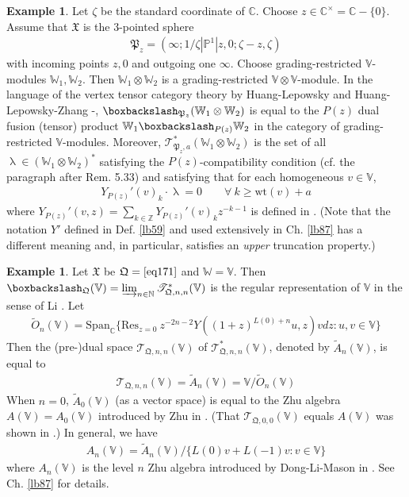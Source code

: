 \documentclass[11pt,b5paper,notitlepage]{article}
\theoremstyle{definition}
\newtheorem{eg}[df]{Example}
\theoremstyle{plain}
\newcommand{\fk}{\mathfrak}
\newcommand{\wtd}{\widetilde}
\newcommand{\Res}{\mathrm{Res}}
\newcommand{\Span}{\mathrm{Span}}
\newcommand{\scr}{\mathscr}
\newcommand{\Vbb}{\mathbb V}
\newcommand{\Wbb}{\mathbb W}
\newcommand{\Cbb}{\mathbb C}
\newcommand{\Nbb}{\mathbb N}
\newcommand{\Zbb}{\mathbb Z}
\newcommand{\Pbb}{\mathbb P}
\newcommand{\wt}{\mathrm{wt}}
\newcommand{\<}{\left\langle}
\renewcommand{\>}{\right\rangle}
\newcommand{\bbs}{\boxbackslash}
\newcommand{\fq}{{\mathfrak Q}}
\numberwithin{equation}{subsection}
\begin{document}
\begin{eg}
Let $\zeta$ be the standard coordinate of $\Cbb$. Choose $z\in\Cbb^\times=\Cbb-\{0\}$. Assume that $\fk X$ is the $3$-pointed sphere
\begin{align}
\fk P_z=(\infty;1/\zeta| \Pbb^1|z,0;\zeta-z,\zeta)
\end{align}
with incoming points $z,0$ and outgoing one $\infty$. Choose grading-restricted $\Vbb$-modules $\Wbb_1,\Wbb_2$. Then $\Wbb_1\otimes\Wbb_2$ is a grading-restricted $\Vbb\otimes\Vbb$-module. In the language of the vertex tensor category theory by Huang-Lepowsky \cite{HL-tensor-1,HL-tensor-2,HL-tensor-3,Hua-tensor-4} and Huang-Lepowsky-Zhang \cite{HLZ1,HLZ2}-\cite{HLZ8}, $\bbs_{\fk P_z}(\Wbb_1\otimes \Wbb_2)$ is equal to the $P(z)$ dual fusion (tensor) product $\Wbb_1\bbs_{P(z)}\Wbb_2$ in the category of grading-restricted $\Vbb$-modules. Moreover, $\scr T_{\fk P_z,a}^*(\Wbb_1\otimes\Wbb_2)$ is the set of all $\uplambda\in(\Wbb_1\otimes\Wbb_2)^*$ satisfying the $P(z)$-compatibility condition (cf. \cite[Sec. 5.2]{HLZ4} the paragraph after Rem. 5.33) and satisfying that for each homogeneous $v\in \Vbb$,
\begin{align}
Y_{P(z)}'(v)_k\cdot\uplambda=0\qquad\forall~k\geq\wt(v)+a
\end{align}
where $Y_{P(z)}'(v,z)=\sum_{k\in\Zbb}Y_{P(z)}'(v)_kz^{-k-1}$ is defined in \cite[Def. 5.3]{HLZ4}. (Note that the notation $Y'$ defined in Def. \ref{lb59} and used extensively in Ch. \ref{lb87} has a different meaning and, in particular, satisfies an \emph{upper} truncation property.)
\end{eg}



\begin{eg}
Let $\fk X$ be $\fq=\eqref{eq171}$ and $\Wbb=\Vbb$. Then $\bbs_\fq(\Vbb)=\varinjlim_{n\in\Nbb}\scr T_{\fq,n,n}^*(\Vbb)$ is the regular representation of $\Vbb$ in the sense of Li \cite{Li-regular-rep,LS-twisted-regular-rep}. Let 
\begin{gather}
\wtd O_n(\Vbb)=\Span_\Cbb\big\{\Res_{z=0}~z^{-2n-2}Y((1+z)^{L(0)+n}u,z)vdz:u,v\in\Vbb  \big\}
\end{gather}
Then the (pre-)dual space $\scr T_{\fq,n,n}(\Vbb)$ of $\scr T_{\fq,n,n}^*(\Vbb)$, denoted by $\wtd A_n(\Vbb)$, is equal to
\begin{gather}
\scr T_{\fq,n,n}(\Vbb)=\wtd A_n(\Vbb)=\Vbb/\wtd O_n(\Vbb)
\end{gather}
When $n=0$, $\wtd A_0(\Vbb)$ (as a vector space) is equal to the Zhu algebra $A(\Vbb)=A_0(\Vbb)$ introduced by Zhu in \cite{Zhu-modular-invariance}. (That $\scr T_{\fq,0,0}(\Vbb)$ equals $A(\Vbb)$ was shown in \cite[Prop. 7.2.2 and A.2.7]{NT-P1_conformal_blocks}.) In general, we have
\begin{align}
A_n(\Vbb)=\wtd A_n(\Vbb)/\{L(0)v+L(-1)v:v\in\Vbb\}
\end{align}
where $A_n(\Vbb)$ is the level $n$ Zhu algebra introduced by Dong-Li-Mason in \cite{DLM-Zhu}. See Ch. \ref{lb87} for details.
\end{eg}
\end{document}
